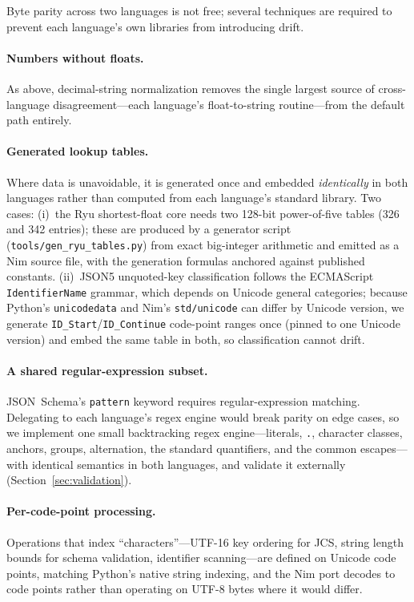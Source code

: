 \documentclass[11pt]{article}
\newcommand{\code}[1]{\texttt{#1}}
\begin{document}
Byte parity across two languages is not free; several techniques are required
to prevent each language's own libraries from introducing drift.

\paragraph{Numbers without floats.}
As above, decimal-string normalization removes the single largest source of
cross-language disagreement---each language's float-to-string routine---from the
default path entirely.

\paragraph{Generated lookup tables.}
Where data is unavoidable, it is generated once and embedded \emph{identically}
in both languages rather than computed from each language's standard library.
Two cases: (i)~the Ryu shortest-float core needs two 128-bit power-of-five
tables (326 and 342 entries); these are produced by a generator script
(\code{tools/gen\_ryu\_tables.py}) from exact big-integer arithmetic and emitted
as a Nim source file, with the generation formulas anchored against published
constants. (ii)~JSON5 unquoted-key classification follows the ECMAScript
\code{IdentifierName} grammar, which depends on Unicode general categories;
because Python's \code{unicodedata} and Nim's \code{std/unicode} can differ by
Unicode version, we generate \code{ID\_Start}/\code{ID\_Continue} code-point
ranges once (pinned to one Unicode version) and embed the same table in both,
so classification cannot drift.

\paragraph{A shared regular-expression subset.}
JSON~Schema's \code{pattern} keyword requires regular-expression matching.
Delegating to each language's regex engine would break parity on edge cases, so
we implement one small backtracking regex engine---literals, \code{.}, character
classes, anchors, groups, alternation, the standard quantifiers, and the common
escapes---with identical semantics in both languages, and validate it
externally (Section~\ref{sec:validation}).

\paragraph{Per-code-point processing.}
Operations that index ``characters''---UTF-16 key ordering for JCS, string
length bounds for schema validation, identifier scanning---are defined on
Unicode code points, matching Python's native string indexing, and the Nim port
decodes to code points rather than operating on UTF-8 bytes where it would
differ.
\end{document}

